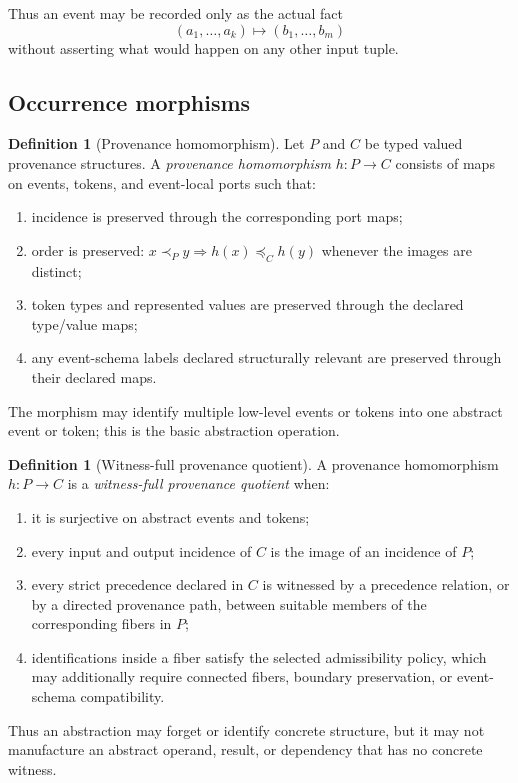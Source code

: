 \documentclass[11pt,a4paper]{article}
\theoremstyle{clean}
\theoremstyle{definition}
\newtheorem{definition}[theorem]{Definition}
\begin{document}
Thus an event may be recorded only as the actual fact
\[
(a_1,\ldots,a_k)\mapsto(b_1,\ldots,b_m)
\]
without asserting what would happen on any other input tuple.

\subsection{Occurrence morphisms}

\begin{definition}[Provenance homomorphism]
Let $P$ and $C$ be typed valued provenance structures. A \emph{provenance homomorphism} $h:P\to C$ consists of maps on events, tokens, and event-local ports such that:
\begin{enumerate}
  \item incidence is preserved through the corresponding port maps;
  \item order is preserved: $x\prec_P y\Rightarrow h(x)\preceq_C h(y)$ whenever the images are distinct;
  \item token types and represented values are preserved through the declared type/value maps;
  \item any event-schema labels declared structurally relevant are preserved through their declared maps.
\end{enumerate}
The morphism may identify multiple low-level events or tokens into one abstract event or token; this is the basic abstraction operation.
\end{definition}

\begin{definition}[Witness-full provenance quotient]
A provenance homomorphism $h:P\to C$ is a \emph{witness-full provenance quotient} when:
\begin{enumerate}
  \item it is surjective on abstract events and tokens;
  \item every input and output incidence of $C$ is the image of an incidence of $P$;
  \item every strict precedence declared in $C$ is witnessed by a precedence relation, or by a directed provenance path, between suitable members of the corresponding fibers in $P$;
  \item identifications inside a fiber satisfy the selected admissibility policy, which may additionally require connected fibers, boundary preservation, or event-schema compatibility.
\end{enumerate}
Thus an abstraction may forget or identify concrete structure, but it may not manufacture an abstract operand, result, or dependency that has no concrete witness.
\end{definition}
\end{document}
